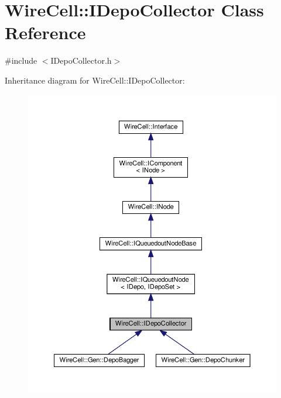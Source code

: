 \hypertarget{class_wire_cell_1_1_i_depo_collector}{}\section{Wire\+Cell\+:\+:I\+Depo\+Collector Class Reference}
\label{class_wire_cell_1_1_i_depo_collector}


{\ttfamily \#include $<$I\+Depo\+Collector.\+h$>$}



Inheritance diagram for Wire\+Cell\+:\+:I\+Depo\+Collector\+:
\nopagebreak
\begin{figure}[H]
\begin{center}
\leavevmode
\includegraphics[width=350pt]{class_wire_cell_1_1_i_depo_collector__inherit__graph}
\end{center}
\end{figure}



